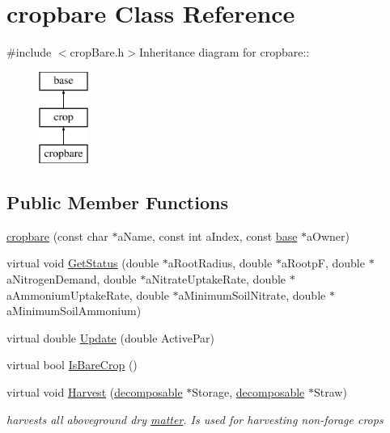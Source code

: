 \hypertarget{classcropbare}{
\section{cropbare Class Reference}
\label{classcropbare}
}


{\ttfamily \#include $<$cropBare.h$>$}Inheritance diagram for cropbare::\begin{figure}[H]
\begin{center}
\leavevmode
\includegraphics[height=3cm]{classcropbare}
\end{center}
\end{figure}
\subsection*{Public Member Functions}
\begin{DoxyCompactItemize}
\item 
\hyperlink{classcropbare_a6d017192b466eb2f5c9bd9d4ce8df322}{cropbare} (const char $\ast$aName, const int aIndex, const \hyperlink{classbase}{base} $\ast$aOwner)
\item 
virtual void \hyperlink{classcropbare_a776fa8bf716f23af17ff9c1bb10d1bdc}{GetStatus} (double $\ast$aRootRadius, double $\ast$aRootpF, double $\ast$aNitrogenDemand, double $\ast$aNitrateUptakeRate, double $\ast$aAmmoniumUptakeRate, double $\ast$aMinimumSoilNitrate, double $\ast$aMinimumSoilAmmonium)
\item 
virtual double \hyperlink{classcropbare_a141cff2a17ccfb22637dd0692a427795}{Update} (double ActivePar)
\item 
virtual bool \hyperlink{classcropbare_a9fa5ef7d9c5e0ca6d8cc6fe35b00ab86}{IsBareCrop} ()
\item 
virtual void \hyperlink{classcropbare_ab9e81123fa54843efce5da0861e401f6}{Harvest} (\hyperlink{classdecomposable}{decomposable} $\ast$Storage, \hyperlink{classdecomposable}{decomposable} $\ast$Straw)
\begin{DoxyCompactList}\small\item\em harvests all aboveground dry \hyperlink{classmatter}{matter}. Is used for harvesting non-\/forage crops \item\end{DoxyCompactList}\end{DoxyCompactItemize}


